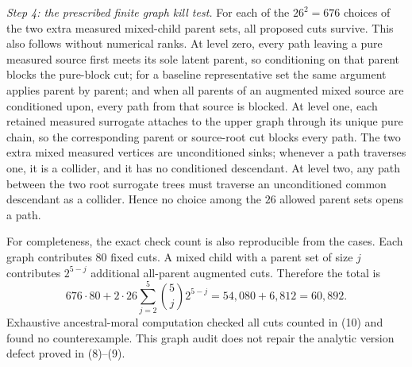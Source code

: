 \emph{Step 4: the prescribed finite graph kill test.}
For each of the \(26^2=676\) choices of the two extra measured mixed-child parent sets, all proposed cuts survive.  This also follows without numerical ranks.  At level zero, every path leaving a pure measured source first meets its sole latent parent, so conditioning on that parent blocks the pure-block cut; for a baseline representative set the same argument applies parent by parent; and when all parents of an augmented mixed source are conditioned upon, every path from that source is blocked.  At level one, each retained measured surrogate attaches to the upper graph through its unique pure chain, so the corresponding parent or source-root cut blocks every path.  The two extra mixed measured vertices are unconditioned sinks; whenever a path traverses one, it is a collider, and it has no conditioned descendant.  At level two, any path between the two root surrogate trees must traverse an unconditioned common descendant as a collider.  Hence no choice among the \(26\) allowed parent sets opens a path.

For completeness, the exact check count is also reproducible from the cases.  Each graph contributes \(80\) fixed cuts.  A mixed child with a parent set of size \(j\) contributes \(2^{5-j}\) additional all-parent augmented cuts.  Therefore the total is
\[
 676\cdot80
 +2\cdot26\sum_{j=2}^{5}\binom{5}{j}2^{5-j}
 =54{,}080+6{,}812
 =60{,}892. \tag{10}
\]
Exhaustive ancestral-moral computation checked all cuts counted in (10) and found no counterexample.  This graph audit does not repair the analytic version defect proved in (8)--(9).
